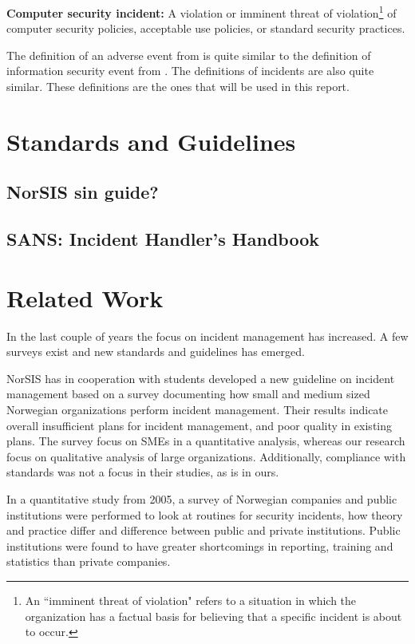 \textbf{Computer security incident:} A violation or imminent threat of violation\footnote{An ``imminent threat of violation" refers to a situation in which the organization has a factual basis for believing that a specific incident is about to occur.} of computer security policies, acceptable use policies, or standard security practices.

The definition of an adverse event from \cite{nist800-61} is quite similar to the definition of information security event from \cite{ISO/IEC27000}. The definitions of incidents are also quite similar. These definitions are the ones that will be used in this report.

\section{Standards and Guidelines}


\subsection{NorSIS sin guide?}
\subsection{SANS: Incident Handler's Handbook}

\section{Related Work}
In the last couple of years the focus on incident management has increased. A few surveys exist and new standards and guidelines has emerged.

NorSIS has in cooperation with students\cite{sand2010hendelseshaandtering} developed a new guideline on incident management based on a survey documenting how small and medium sized Norwegian organizations perform incident management. Their results indicate overall insufficient plans for incident management, and poor quality in existing plans. The survey focus on \ac{SMEs}  in a quantitative analysis, whereas our research focus on qualitative analysis of large organizations. Additionally, compliance with standards was not a focus in their studies, as is in ours.

In a quantitative study from 2005\cite{brage}, a survey of Norwegian companies and public institutions were performed to look at routines for security incidents, how theory and practice differ and difference between public and private institutions. Public institutions were found to have greater shortcomings in reporting, training and statistics than private companies. 